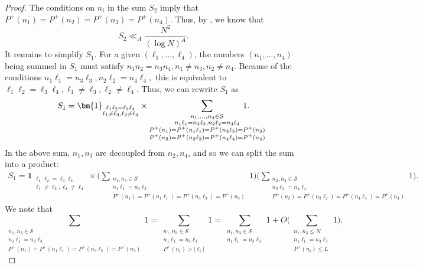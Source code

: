 \documentclass[12pt]{amsart}
\renewcommand{\leq}{\leqslant}
\numberwithin{equation}{section}
\theoremstyle{plain}
\theoremstyle{definition}
\renewcommand{\l}{\ell}
\renewcommand{\P}{\mathbb{P}}
\newcommand{\CS}{\mathcal{S}}
\begin{document}
\begin{proof}
		
		The conditions on $n_i$ in the sum $S_2$ imply that $P^+(n_1) = P^+(n_2) = P^+(n_3) = P^+(n_4)$. Thus, by , we know that
		\begin{equation}\label{eq: S2 bound}
			S_2 \ll_A \frac{N^2}{(\log N)^A}.
		\end{equation}
		It remains to simplify $S_1$. For a given $(\l_1,\dots,\l_4)$, the numbers $(n_1,\dots,n_4)$ being summed in $S_1$ must satisfy $n_1n_2=n_3n_4, n_1 \ne n_3, n_2 \ne n_4$. Because of the conditions $n_1\l_1 = n_3\l_3, n_2\l_2 = n_4\l_4,$ this is equivalent to $\l_1\l_2=\l_3\l_4, \l_1 \ne \l_3, \l_2 \ne \l_4$. Thus, we can rewrite $S_1$ as
		\begin{align*}
			S_1 = \bm{1}_{\substack{\l_1\l_2=\l_3\l_4 \\ \l_1 \ne \l_3, \l_2 \ne \l_4}} \times \sum_{\substack{n_1,\dots,n_4 \in \CS  \\ n_1\l_1=n_3\l_3, n_2\l_2 = n_4\l_4\\ P^+(n_1) = P^+(n_1 \l_1)=P^+(n_3 \l_3) = P^+(n_3) \\P^+(n_2) =  P^+(n_2 \l_2) = P^+(n_4 \l_4) = P^+(n_4)}} \hspace{-1cm} 1.
		\end{align*}
		In the above sum, $n_1,n_3$ are decoupled from $n_2,n_4$, and so we can split the sum into a product:
		\begin{align}\label{eq: S1 halfway reduction}
			S_1 = \bm{1}_{\substack{\l_1\l_2=\l_3\l_4 \\ \l_1 \ne \l_3, \l_2 \ne \l_4}} \times \bigg( \sum_{\substack{n_1,n_3 \in \CS \\ n_1\l_1=n_3\l_3  \\ P^+(n_1) = P^+(n_1 \l_1)=P^+(n_3 \l_3) = P^+(n_3)}} 1\bigg)\bigg( \sum_{\substack{n_2,n_4 \in \CS \\ n_2\l_2 = n_4\l_4 \\ P^+(n_2) = P^+(n_2 \l_2)=P^+(n_4 \l_4) = P^+(n_4)}} 1\bigg).
		\end{align}
		We note that
		\begin{equation} \label{eq: S1 prime factor reduction}
			\sum_{\substack{n_1,n_3 \in \CS \\ n_1\l_1=n_3\l_3  \\ P^+(n_1) = P^+(n_1 \l_1)=P^+(n_3 \l_3) = P^+(n_3)}} 1 = \sum_{\substack{n_1,n_3 \in \CS \\ n_1\l_1=n_3\l_3  \\ P^+(n_i) > |\l_i| }} 1 = \sum_{\substack{n_1,n_3 \in \CS \\ n_1\l_1=n_3\l_3}} 1 + O\bigg(\sum_{\substack{n_1,n_3 \leq N \\ n_1\l_1=n_3\l_3  \\ P^+(n_i) \leq L }} 1\bigg).

\end{equation}
\end{proof}
\end{document}
